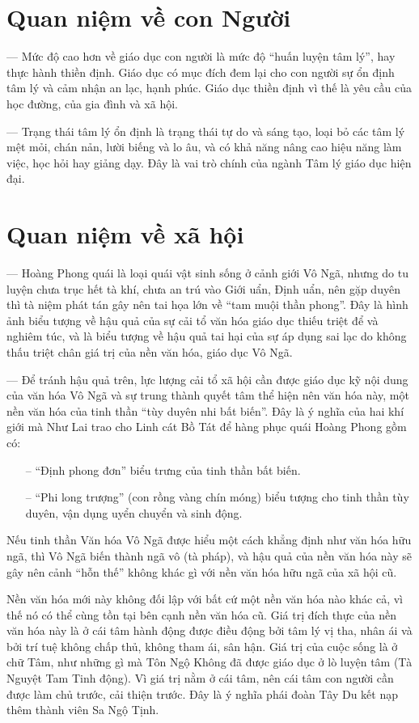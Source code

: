 \section{Quan niệm về con Người} %
\label{sec:20_21_22_con_nguoi}

— Mức độ cao hơn về giáo dục con người là mức độ ``huấn luyện tâm lý'', hay thực hành thiền định. Giáo dục có mục đích đem lại cho con người sự ổn định tâm lý và cảm nhận an lạc, hạnh phúc. Giáo dục thiền định vì thế là yêu cầu của học đường, của gia đình và xã hội.

— Trạng thái tâm lý ổn định là trạng thái tự do và sáng tạo, loại bỏ các tâm lý mệt mỏi, chán nản, lười biếng và lo âu, và có khả năng nâng cao hiệu năng làm việc, học hỏi hay giảng dạy. Đây là vai trò chính của ngành Tâm lý giáo dục hiện đại.

\section{Quan niệm về xã hội} %
\label{sec:20_21_22_xa_hoi}

— Hoàng Phong quái là loại quái vật sinh sống ở cảnh giới Vô Ngã, nhưng do tu luyện chưa trục hết tà khí, chưa an trú vào Giới uẩn, Định uẩn, nên gặp duyên thì tà niệm phát tán gây nên tai họa lớn về ``tam muội thần phong''. Đây là hình ảnh biểu tượng về hậu quả của sự cải tổ văn hóa giáo dục thiếu triệt để và nghiêm túc, và là biểu tượng về hậu quả tai hại của sự áp dụng sai lạc do không thấu triệt chân giá trị của nền văn hóa, giáo dục Vô Ngã.

— Để tránh hậu quả trên, lực lượng cải tổ xã hội cần được giáo dục kỹ nội dung của văn hóa Vô Ngã và sự trung thành quyết tâm thể hiện nên văn hóa này, một nền văn hóa của tinh thần ``tùy duyên nhi bất biến''. Đây là ý nghĩa của hai khí giới mà Như Lai trao cho Linh cát Bồ Tát để hàng phục quái Hoàng Phong gồm có:

\begin{itemize}
   \item[–] ``Định phong đơn'' biểu trưng của tinh thần bất biến.
   \item[–] ``Phi long trượng'' (con rồng vàng chín móng) biểu tượng cho tinh thần tùy duyên, vận dụng uyển chuyển và sinh động.
\end{itemize}

Nếu tinh thần Văn hóa Vô Ngã được hiểu một cách khẳng định như văn hóa hữu ngã, thì Vô Ngã biến thành ngã vô (tà pháp), và hậu quả của nền văn hóa này sẽ gây nên cảnh ``hỗn thế'' không khác gì với nền văn hóa hữu ngã của xã hội cũ.

Nền văn hóa mới này không đối lập với bất cứ một nền văn hóa nào khác cả, vì thế nó có thể cùng tồn tại bên cạnh nền văn hóa cũ. Giá trị đích thực của nền văn hóa này là ở cái tâm hành động được điều động bởi tâm lý vị tha, nhân ái và bởi trí tuệ không chấp thủ, không tham ái, sân hận. Giá trị của cuộc sống là ở chữ Tâm, như những gì mà Tôn Ngộ Không đã được giáo dục ở lò luyện tâm (Tà Nguyệt Tam Tinh động). Vì giá trị nằm ở cái tâm, nên cái tâm con người cần được làm chủ trước, cải thiện trước. Đây là ý nghĩa phái đoàn Tây Du kết nạp thêm thành viên Sa Ngộ Tịnh.
